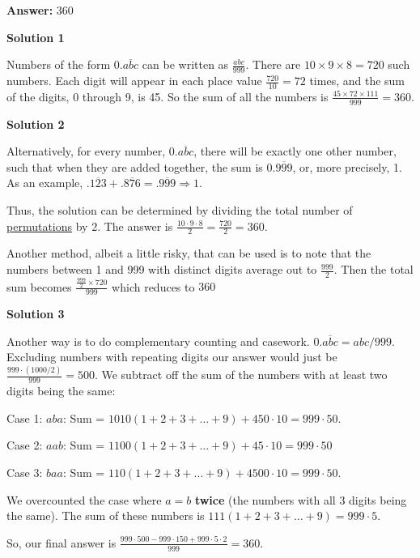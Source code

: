 \begin{enumerate}
 \textbf{Answer: }360



\textbf{Solution 1}

Numbers of the form $0.\overline{abc}$ can be written as $\frac{abc}{999}$. There are $10\times9\times8=720$ such numbers. Each digit will appear in each place value $\frac{720}{10}=72$ times, and the sum of the digits, 0 through 9, is 45. So the sum of all the numbers is $\frac{45\times72\times111}{999}= \boxed{360}$.

 



\textbf{Solution 2}

Alternatively, for every number, $0.\overline{abc}$, there will be exactly one other number, such that when they are added together, the sum is $0.\overline{999}$, or, more precisely, 1. As an example, $.\overline{123}+.\overline{876}=.\overline{999} \Longrightarrow 1$.

 Thus, the solution can be determined by dividing the total number of \href{https://artofproblemsolving.com/wiki/index.php?title=Permutation}{permutations} by 2. The answer is $\frac{10 \cdot 9 \cdot 8}{2} = \frac{720}{2}= \boxed{360}$.

 Another method, albeit a little risky, that can be used is to note that the numbers between 1 and 999 with distinct digits average out to $\frac{999}{2}$. Then the total sum becomes $\frac{\frac{999}{2}\times720}{999}$ which reduces to $\boxed{360}$




\textbf{Solution 3}

Another way is to do complementary counting and casework. $0.\overline{abc} = abc/999$. Excluding numbers with repeating digits our answer would just be $\frac{999 \cdot (1000/2)}{999} = 500$. We subtract off the sum of the numbers with at least two digits being the same:

 
Case 1: $aba$: Sum = $1010(1 + 2 + 3 + \dots + 9) + 450\cdot 10 = 999 \cdot 50$.

 
Case 2: $aab$: Sum = $1100(1 + 2 + 3 + \dots + 9) + 45\cdot 10 = 999 \cdot 50$

 
Case 3: $baa$: Sum = $110(1 + 2 + 3 + \dots + 9) + 4500\cdot 10 = 999 \cdot 50$.

 
We overcounted the case where $a = b$ \textbf{twice} (the numbers with all 3 digits being the same). The sum of these numbers is $111(1 + 2 + 3 + \dots + 9) = 999 \cdot 5$. 

 
So, our final answer is $\frac{999 \cdot 500 - 999 \cdot 150 + 999 \cdot 5 \cdot 2}{999} = \boxed{360}$.


\end{enumerate}
